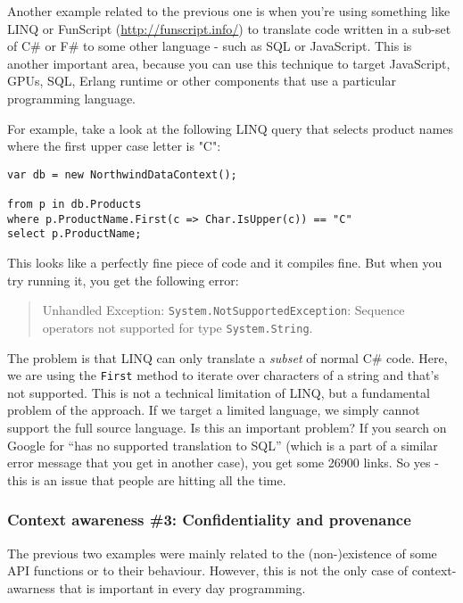 Another example related to the previous one is when you're using something like LINQ or 
FunScript (\url{http://funscript.info/}) to translate code written in a sub-set of C\# or F\#
to some other language - such as SQL or JavaScript. This is another important area, because
you can use this technique to target JavaScript, GPUs, SQL, Erlang runtime or other components 
that use a particular programming language.

For example, take a look at the following LINQ query that selects product names where the
first upper case letter is "C":

\begin{verbatim}
var db = new NorthwindDataContext();

from p in db.Products
where p.ProductName.First(c => Char.IsUpper(c)) == "C"
select p.ProductName;
\end{verbatim}

This looks like a perfectly fine piece of code and it compiles fine. But when you try running
it, you get the following error:

\begin{quote}
Unhandled Exception: \texttt{System.NotSupportedException}: Sequence operators 
not supported for type \texttt{System.String}.
\end{quote}

The problem is that LINQ can only translate a \emph{subset} of normal C\# code. Here, we are using
the \texttt{First} method to iterate over characters of a string and that's not supported. This is
not a technical limitation of LINQ, but a fundamental problem of the approach. If we target a 
limited language, we simply cannot support the full source language. Is this an important 
problem? If you search on Google for ``has no supported translation to SQL'' 
(which is a part of a similar error message that you get in another case), you get some 26900
links. So yes - this is an issue that people are hitting all the time.


\subsubsection{Context awareness \#3: Confidentiality and provenance}

The previous two examples were mainly related to the (non-)existence of some API functions
or to their behaviour. However, this is not the only case of context-awarness that is important
in every day programming.

